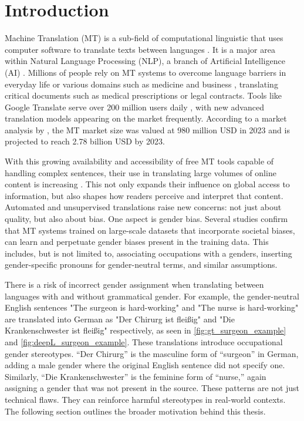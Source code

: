 \chapter{Introduction}
Machine Translation (MT) is a sub-field of computational linguistic that uses computer software to translate texts between languages \citep{linMachineTranslationAcademic2009}. It is a major area within Natural Language Processing (NLP), a branch of Artificial Intelligence (AI) \citep{smacchiaDoesAIReflect2024}. Millions of people rely on MT systems to overcome language barriers in everyday life or various domains such as medicine and business \citep{kapplAreAllSpanish2025}, translating critical documents such as medical prescriptions or legal contracts. Tools like Google Translate serve over 200 million users daily \citep{pratesAssessingGenderBias2019,shresthaExploringGenderBiases2022}, with new advanced translation models appearing on the market frequently. According to a market analysis by \citet{skyquestMachineTranslationMT2025}, the MT market size was valued at 980 million USD in 2023 and is projected to reach 2.78 billion USD by 2023. 

With this growing availability and accessibility of free MT tools capable of handling complex sentences, their use in translating large volumes of online content is increasing \citep{thompsonShockingAmountWeb2024}. This not only expands their influence on global access to information, but also shapes how readers perceive and interpret that content. Automated and unsupervised translations raise new concerns: not just about quality, but also about bias. One aspect is gender bias. Several studies \citep{smacchiaDoesAIReflect2024,choMeasuringGenderBias2019,stanczakSurveyGenderBias2021,soundararajanInvestigatingGenderBias2024} confirm that MT systems trained on large-scale datasets that incorporate societal biases, can learn and perpetuate gender biases present in the training data. This includes, but is not limited to, associating occupations with a genders, inserting gender-specific pronouns for gender-neutral terms, and similar assumptions.

There is a risk of incorrect gender assignment when translating between languages with and without grammatical gender. For example, the gender-neutral English sentences "The surgeon is hard-working" and "The nurse is hard-working" are translated into German as "Der Chirurg ist fleißig" and "Die Krankenschwester ist fleißig" respectively, as seen in \autoref{fig:gt_surgeon_example} and \autoref{fig:deepL_surgeon_example}. These translations introduce occupational gender stereotypes. “Der Chirurg” is the masculine form of “surgeon” in German, adding a male gender where the original English sentence did not specify one. Similarly, “Die Krankenschwester” is the feminine form of “nurse,” again assigning a gender that was not present in the source. These patterns are not just technical flaws. They can reinforce harmful stereotypes in real-world contexts. The following section outlines the broader motivation behind this thesis.


